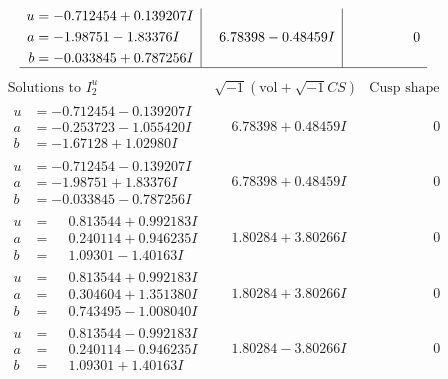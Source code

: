 \documentclass[1p]{elsarticle_modified}
\theoremstyle{definition}
\newcommand{\I}{\sqrt{-1}}
\begin{document}
$$\begin{array}{c|c|c}
\begin{aligned}
u &= -0.712454 + 0.139207 I \\
a &= -1.98751 - 1.83376 I \\
b &= -0.033845 + 0.787256 I\end{aligned}
 & \phantom{-}6.78398 - 0.48459 I & \phantom{-0.000000 } 0\\
 \hline 
 \end{array}$$\newpage$$\begin{array}{c|c|c}  
\text{Solutions to }I^u_{2}& \I (\text{vol} + \sqrt{-1}CS) & \text{Cusp shape}\\
 \hline 
\begin{aligned}
u &= -0.712454 - 0.139207 I \\
a &= -0.253723 - 1.055420 I \\
b &= -1.67128 + 1.02980 I\end{aligned}
 & \phantom{-}6.78398 + 0.48459 I & \phantom{-0.000000 } 0 \\ \hline\begin{aligned}
u &= -0.712454 - 0.139207 I \\
a &= -1.98751 + 1.83376 I \\
b &= -0.033845 - 0.787256 I\end{aligned}
 & \phantom{-}6.78398 + 0.48459 I & \phantom{-0.000000 } 0 \\ \hline\begin{aligned}
u &= \phantom{-}0.813544 + 0.992183 I \\
a &= \phantom{-}0.240114 + 0.946235 I \\
b &= \phantom{-}1.09301 - 1.40163 I\end{aligned}
 & \phantom{-}1.80284 + 3.80266 I & \phantom{-0.000000 } 0 \\ \hline\begin{aligned}
u &= \phantom{-}0.813544 + 0.992183 I \\
a &= \phantom{-}0.304604 + 1.351380 I \\
b &= \phantom{-}0.743495 - 1.008040 I\end{aligned}
 & \phantom{-}1.80284 + 3.80266 I & \phantom{-0.000000 } 0 \\ \hline\begin{aligned}
u &= \phantom{-}0.813544 - 0.992183 I \\
a &= \phantom{-}0.240114 - 0.946235 I \\
b &= \phantom{-}1.09301 + 1.40163 I\end{aligned}
 & \phantom{-}1.80284 - 3.80266 I & \phantom{-0.000000 } 0 \\ \hline\begin{aligned}

\end{aligned}
\end{array}$$
\end{document}
